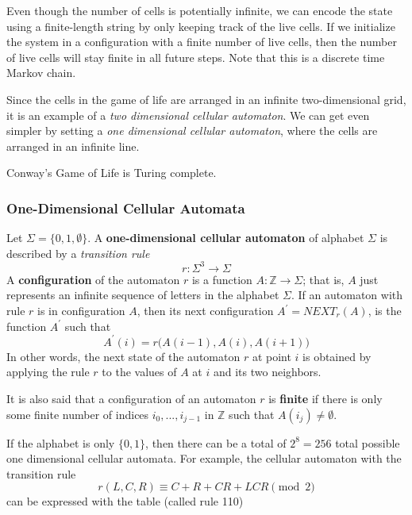 \documentclass{article}
\begin{document}
  Even though the number of cells is potentially infinite, we can encode the state using a finite-length string by only keeping track of the live cells. If we initialize the system in a configuration with a finite number of live cells, then the number of live cells will stay finite in all future steps. Note that this is a discrete time Markov chain. 

  Since the cells in the game of life are arranged in an infinite two-dimensional grid, it is an example of a \textit{two dimensional cellular automaton}. We can get even simpler by setting a \textit{one dimensional cellular automaton}, where the cells are arranged in an infinite line. 

  \begin{theorem}
  Conway's Game of Life is Turing complete. 
  \end{theorem}

  \subsubsection{One-Dimensional Cellular Automata}
  \begin{definition}
  Let $\Sigma = \{0, 1, \emptyset\}$. A \textbf{one-dimensional cellular automaton} of alphabet $\Sigma$ is described by a \textit{transition rule}
  \[r: \Sigma^3 \longrightarrow \Sigma\]
  A \textbf{configuration} of the automaton $r$ is a function $A: \mathbb{Z} \longrightarrow \Sigma$; that is, $A$ just represents an infinite sequence of letters in the alphabet $\Sigma$. If an automaton with rule $r$ is in configuration $A$, then its next configuration $A^\prime = NEXT_r (A)$, is the function $A^\prime$ such that 
  \[A^\prime (i) = r\big( A(i-1), A(i), A(i+1)\big)\]
  In other words, the next state of the automaton $r$ at point $i$ is obtained by applying the rule $r$ to the values of $A$ at $i$ and its two neighbors. 

  It is also said that a configuration of an automaton $r$ is \textbf{finite} if there is only some finite number of indices $i_0, ..., i_{j-1}$ in $\mathbb{Z}$ such that $A(i_j) \neq \emptyset$. 
  \end{definition}

  If the alphabet is only $\{0, 1\}$, then there can be a total of $2^8 = 256$ total possible one dimensional cellular automata. For example, the cellular automaton with the transition rule
  \[r(L, C, R) \equiv C + R + CR + LCR \pmod{2}\]
  can be expressed with the table (called rule 110)
\end{document}
